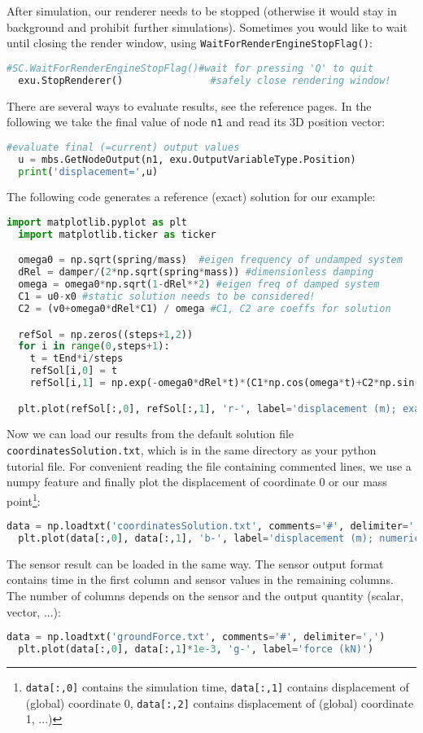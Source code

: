 After simulation, our renderer needs to be stopped (otherwise it would stay in background and prohibit further simulations). 
Sometimes you would like to wait until closing the render window, using \texttt{WaitForRenderEngineStopFlag()}:
\begin{lstlisting}[language=Python, firstnumber=49]
  #SC.WaitForRenderEngineStopFlag()#wait for pressing 'Q' to quit
  exu.StopRenderer()               #safely close rendering window!
\end{lstlisting}
%
There are several ways to evaluate results, see the reference pages. In the following we take the final value of node \texttt{n1} and read its 3D position vector:
\begin{lstlisting}[language=Python, firstnumber=51]
  #evaluate final (=current) output values
  u = mbs.GetNodeOutput(n1, exu.OutputVariableType.Position)
  print('displacement=',u)
\end{lstlisting}
%
The following code generates a reference (exact) solution for our example:
\begin{lstlisting}[language=Python, firstnumber=54]
  import matplotlib.pyplot as plt
  import matplotlib.ticker as ticker

  omega0 = np.sqrt(spring/mass)  #eigen frequency of undamped system
  dRel = damper/(2*np.sqrt(spring*mass)) #dimensionless damping
  omega = omega0*np.sqrt(1-dRel**2) #eigen freq of damped system
  C1 = u0-x0 #static solution needs to be considered!
  C2 = (v0+omega0*dRel*C1) / omega #C1, C2 are coeffs for solution

  refSol = np.zeros((steps+1,2))
  for i in range(0,steps+1):
    t = tEnd*i/steps
    refSol[i,0] = t
    refSol[i,1] = np.exp(-omega0*dRel*t)*(C1*np.cos(omega*t)+C2*np.sin(omega*t))+x0

  plt.plot(refSol[:,0], refSol[:,1], 'r-', label='displacement (m); exact solution')
\end{lstlisting}
%
Now we can load our results from the default solution file \texttt{coordinatesSolution.txt}, which is in the same
directory as your python tutorial file. For convenient reading the file containing commented lines, we use a numpy feature and
finally plot the displacement of coordinate 0 or our mass point\footnote{\texttt{data[:,0]} contains the simulation time, \texttt{data[:,1]} contains displacement of (global) coordinate 0, \texttt{data[:,2]} contains displacement of (global) coordinate 1, ...)}:
\begin{lstlisting}[language=Python, firstnumber=73]
  data = np.loadtxt('coordinatesSolution.txt', comments='#', delimiter=',')
  plt.plot(data[:,0], data[:,1], 'b-', label='displacement (m); numerical solution') 
\end{lstlisting}
The sensor result can be loaded in the same way. The sensor output format contains time in the first column and sensor values in the remaining columns. The number of columns depends on the 
sensor and the output quantity (scalar, vector, ...):
\begin{lstlisting}[language=Python, firstnumber=75]
  data = np.loadtxt('groundForce.txt', comments='#', delimiter=',')
  plt.plot(data[:,0], data[:,1]*1e-3, 'g-', label='force (kN)')
\end{lstlisting}

